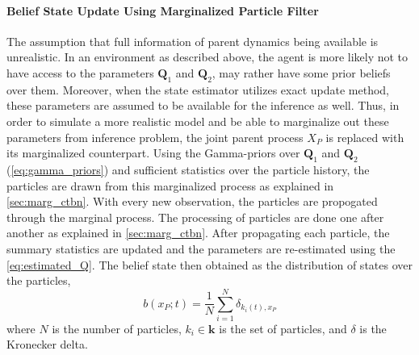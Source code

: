 \paragraph*{Belief State Update Using Marginalized Particle Filter}
\label{par:bs_partFilt}
The assumption that full information of parent dynamics being available is unrealistic. In an environment as described above, the agent is more likely not to have access to the parameters $ \textbf{Q}_1 $ and $ \textbf{Q}_2 $, may rather have some prior beliefs over them. Moreover, when the state estimator utilizes exact update method, these parameters are assumed to be available for the inference as well. Thus, in order to simulate a more realistic model and be able to marginalize out these parameters from inference problem, the joint parent process $ X_P $ is replaced with its marginalized counterpart. Using the Gamma-priors over $ \textbf{Q}_1 $ and $ \textbf{Q}_2 $ (\autoref{eq:gamma_priors}) and sufficient statistics over the particle history, the particles are drawn from this marginalized process as explained in \cref{sec:marg_ctbn}. With every new observation, the particles are propogated through the marginal process. The processing of particles are done one after another as explained in \cref{sec:marg_ctbn}. After propagating each particle, the summary statistics are updated and the parameters are re-estimated using the \autoref{eq:estimated_Q}. The belief state then obtained as the distribution of states over the particles,
\begin{equation}
b(x_P; t) = \frac{1}{N} \sum_{i=1}^{N} \delta_{k_i(t), x_P}
\label{eq:belief_over_particles}
\end{equation}
where $ N $ is the number of particles, $ k_i \in \textbf{k} $ is the set of particles, and $\delta$ is the Kronecker delta.

